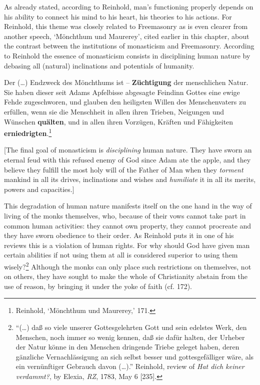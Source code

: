 As already stated, according to Reinhold, man's functioning properly depends on his ability to connect his mind to his heart, his theories to his actions. For Reinhold, this theme was closely related to Freemasonry as is even clearer from another speech, `M\"{o}nchthum und Maurerey', cited earlier in this chapter, about the contrast between the institutions of monasticism and Freemasonry. According to Reinhold the essence of monasticism consists in disciplining human nature by debasing all (natural) inclinations and potentials of humanity.

Der (\ldots ) Endzweck des M\"{o}nchthums ist {--} \textbf{Z\"{u}chtigung} der menschlichen Natur. Sie haben dieser seit Adams Apfelbisse abgesagte Feindinn Gottes eine ewige Fehde zugeschworen, und glauben den heiligsten Willen des Menschenvaters zu erf\"{u}llen, wenn sie die Menschheit in allen ihren Trieben, Neigungen und W\"{u}nschen \textbf{qu\"{a}lten}, und in allen ihren Vorz\"{u}gen, Kr\"{a}ften und F\"{a}higkeiten \textbf{erniedrigten}.\footnote{ Reinhold, `M\"{o}nchthum und Maurerey,' 171. } 

[The final goal of monasticism is \textit{disciplining} human nature. They have sworn an eternal feud with this refused enemy of God since Adam ate the apple, and they believe they fulfill the most holy will of the Father of Man when they \textit{torment} mankind in all its drives, inclinations and wishes and \textit{humiliate} it in all its merits, powers and capacities.]

This degradation of human nature manifests itself on the one hand in the way of living of the monks themselves, who, because of their vows cannot take part in common human activities: they cannot own property, they cannot procreate and they have sworn obedience to their order. As Reinhold puts it in one of his reviews this is a violation of human rights. For why should God have given man certain abilities if not using them at all is considered superior to using them wisely?\footnote{ ``(\ldots ) da\ss{} so viele unserer Gottesgelehrten Gott und sein edelstes Werk, den Menschen, noch immer so wenig kennen, da\ss{} sie daf\"{u}r halten, der Urheber der Natur k\"{o}nne in den Menschen dringende Triebe geleget haben, deren g\"{a}nzliche Vernachl\"{a}ssigung an sich selbst besser und gottesgef\"{a}lliger w\"{a}re, als ein vern\"{u}nftiger Gebrauch davon (\ldots ).'' Reinhold, review of \textit{Hat dich keiner verdammt?}, by Elexia, \textit{RZ}, 1783, May 6 [235]. } Although the monks can only place such restrictions on themselves, not on others, they have sought to make the whole of Christianity abstain from the use of reason, by bringing it under the yoke of faith (cf. 172). 

